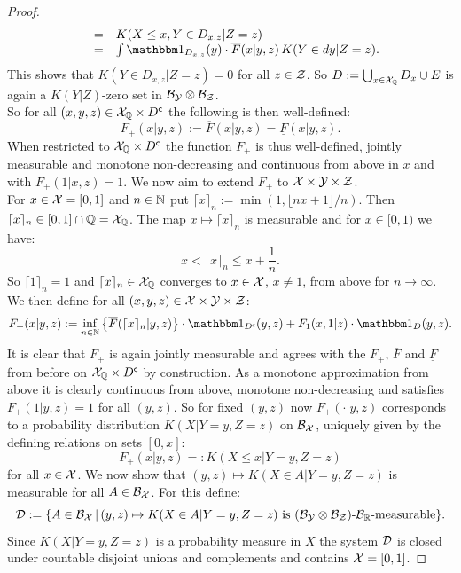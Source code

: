 \begin{Thm}
\begin{proof}
$$\begin{array}{rcl}
&=&  K(X \le x, Y \in D_{x,z} |Z=z) \\
&=& \int \I_{D_{x,z}}(y) \cdot \overline F(x|y,z) \, K(Y \in dy|Z=z).
\end{array}$$
This shows that $K(Y \in D_{x,z}|Z=z)=0$ for all $z \in \mathcal{Z}$.
So $D:= \bigcup_{x \in \mathcal{X}_{\mathbb{Q}}} D_x \cup E$ is again a $K(Y|Z)$-zero set in $\mathcal{B}_{\mathcal{Y}} \otimes \mathcal{B}_{\mathcal{Z}}$.\\
So for all 
$(x,y,z) \in \mathcal{X}_{\mathbb{Q}} \times D^{\mathsf{c}}$
the following is then well-defined:
\[ F_+(x|y,z) := \overline F(x|y,z) = \underline F(x|y,z).\]
When restricted to $\mathcal{X}_{\mathbb{Q}} \times D^{\mathsf{c}}$ the function $F_+$ is thus 
well-defined, jointly measurable and monotone non-decreasing and continuous from above in $x$ and with $F_+(1|x,z)=1$.
We now aim to extend $F_+$ to $\mathcal{X} \times \mathcal{Y} \times \mathcal{Z}$.\\
For $x \in \mathcal{X} =[0,1]$ and $n \in \mathbb{N}$ put $\lceil x\rceil_n:=\min(1,\lfloor nx+1\rfloor/n)$. 
Then $\lceil x\rceil_n \in [0,1] \cap \mathbb{Q} = \mathcal{X}_{\mathbb{Q}}$. 
The map $x \mapsto \lceil x\rceil_n$ is measurable and for $x \in [0,1)$ we have: 
$$x < \lceil x\rceil_n \le x + \frac{1}{n}.$$ 
So $\lceil 1\rceil_n=1$ and  $\lceil x\rceil_n \in \mathcal{X}_{\mathbb{Q}}$ converges to $x \in \mathcal{X}$, $x \neq 1$, from above for $n \to \infty$.\\
We then define for all $(x,y,z) \in \mathcal{X} \times \mathcal{Y} \times \mathcal{Z}$: 
$$ F_+(x|y,z) := \inf_{n \in \N} \left \{ \overline F(\lceil x\rceil_n|y,z)\right\} \cdot \I_{D^\cmpl}(y,z) + F_1(x,1|z) \cdot \I_D(y,z). $$ 
It is clear that $F_+$ is again jointly measurable and agrees with the $F_+$, $\overline F$ and $\underline F$ from before on $\mathcal{X}_{\mathbb{Q}} \times D^{\mathsf{c}}$ by construction.
As a monotone approximation from above it is clearly continuous from above, monotone non-decreasing and satisfies $F_+(1|y,z)=1$ for all $(y,z)$.
So for fixed $(y,z)$ now $F_+(\cdot|y,z)$ corresponds to a probability distribution $K(X|Y=y,Z=z)$ on $\mathcal{B}_{\mathcal{X}}$, uniquely given by the defining relations on sets $[0,x]$:
$$F_+(x|y,z) =: K(X \le x|Y=y,Z=z)$$
for all $x \in \mathcal{X}$. We now show that $(y,z) \mapsto K(X \in A|Y=y,Z=z)$ is measurable for all $A \in \mathcal{B}_{\mathcal{X}}$.
For this define:
$$ \mathcal{D}:= \{ A \in \mathcal{B}_{\mathcal{X}} \,|\, (y,z) \mapsto K(X \in A|Y=y,Z=z) \text{ is } (\mathcal{B}_{\mathcal{Y}}\otimes\mathcal{B}_{\mathcal{Z}})\text{-}\mathcal{B}_{\mathbb{R}}\text{-measurable} \}. $$
Since $K(X|Y=y,Z=z)$ is a probability measure in $X$ the system $\mathcal{D}$ is closed under countable disjoint unions and complements and contains $\mathcal{X}=[0,1]$.

\end{proof}
\end{Thm}
